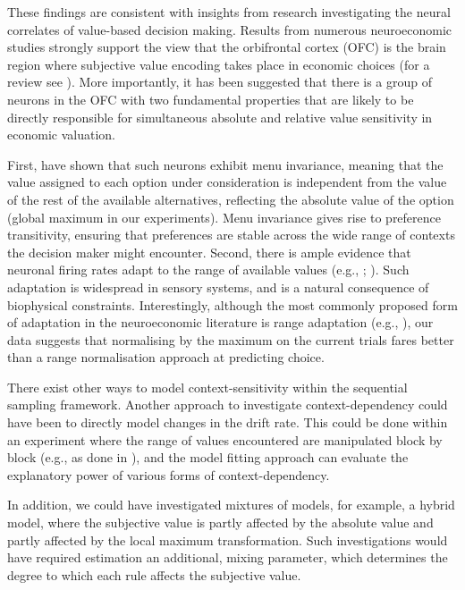 \documentclass[11pt,a4paper]{article}
\begin{document}
These findings are consistent with insights from research investigating the neural correlates of value-based decision making. Results from numerous neuroeconomic studies strongly support the view that the orbifrontal cortex (OFC) is the brain region where subjective value encoding takes place in economic choices (for a review see ). More importantly, it has been suggested that there is a group of neurons in the OFC with two fundamental properties that are likely to be directly responsible for simultaneous absolute and relative value sensitivity in economic valuation.

First,  have shown that such neurons exhibit menu invariance, meaning that the value assigned to each option under consideration is independent from the value of the rest of the available alternatives, reflecting the absolute value of the option (global maximum in our experiments). Menu invariance gives rise to preference transitivity, ensuring that preferences are stable across the wide range of contexts the decision maker might encounter. Second, there is ample evidence that neuronal firing rates adapt to the range of available values (e.g., ; ). Such adaptation is widespread in sensory systems, and is a natural consequence of biophysical constraints. Interestingly, although the most commonly proposed form of adaptation in the neuroeconomic literature is range adaptation (e.g., ), our data suggests that normalising by the maximum on the current trials fares better than a range normalisation approach at predicting choice.


There exist other ways to model context-sensitivity within the sequential sampling framework. Another approach to investigate context-dependency could have been to directly model changes in the drift rate. This could be done within an experiment where the range of values encountered are manipulated block by block (e.g., as done in ), and the model fitting approach can evaluate the explanatory power of various forms of context-dependency.

In addition, we could have investigated mixtures of models, for example, a hybrid model, where the subjective value is partly affected by the absolute value and partly affected by the local maximum transformation. Such investigations would have required estimation an additional, mixing parameter, which determines the degree to which each rule affects the subjective value.
\end{document}
